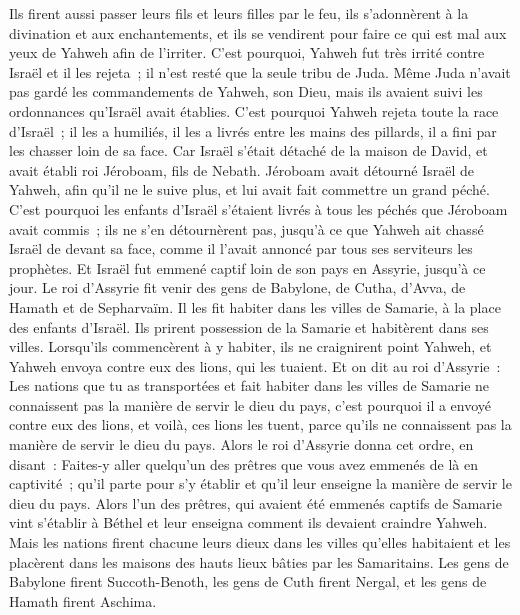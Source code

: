 \begin{multicols}{2}
Ils firent aussi passer leurs fils et leurs filles par le feu, ils s'adonnèrent à la divination et aux enchantements, et ils se vendirent pour faire ce qui est mal aux yeux de Yahweh afin de l'irriter.
C'est pourquoi, Yahweh fut très irrité contre Israël et il les rejeta~; il n'est resté que la seule tribu de Juda.
Même Juda n'avait pas gardé les commandements de Yahweh, son Dieu, mais ils avaient suivi les ordonnances qu'Israël avait établies.
C'est pourquoi Yahweh rejeta toute la race d'Israël~; il les a humiliés, il les a livrés entre les mains des pillards, il a fini par les chasser loin de sa face.
Car Israël s'était détaché de la maison de David, et avait établi roi Jéroboam, fils de Nebath. Jéroboam avait détourné Israël de Yahweh, afin qu'il ne le suive plus, et lui avait fait commettre un grand péché.
C'est pourquoi les enfants d'Israël s'étaient livrés à tous les péchés que Jéroboam avait commis~; ils ne s'en détournèrent pas,
jusqu'à ce que Yahweh ait chassé Israël de devant sa face, comme il l'avait annoncé par tous ses serviteurs les prophètes. Et Israël fut emmené captif loin de son pays en Assyrie, jusqu'à ce jour.
Le roi d'Assyrie fit venir des gens de Babylone, de Cutha, d'Avva, de Hamath et de Sepharvaïm. Il les fit habiter dans les villes de Samarie, à la place des enfants d'Israël. Ils prirent possession de la Samarie et habitèrent dans ses villes.
Lorsqu'ils commencèrent à y habiter, ils ne craignirent point Yahweh, et Yahweh envoya contre eux des lions, qui les tuaient.
Et on dit au roi d'Assyrie~: Les nations que tu as transportées et fait habiter dans les villes de Samarie ne connaissent pas la manière de servir le dieu du pays, c'est pourquoi il a envoyé contre eux des lions, et voilà, ces lions les tuent, parce qu'ils ne connaissent pas la manière de servir le dieu du pays.
Alors le roi d'Assyrie donna cet ordre, en disant~: Faites-y aller quelqu'un des prêtres que vous avez emmenés de là en captivité~; qu'il parte pour s'y établir et qu'il leur enseigne la manière de servir le dieu du pays.
Alors l'un des prêtres, qui avaient été emmenés captifs de Samarie vint s'établir à Béthel et leur enseigna comment ils devaient craindre Yahweh.
Mais les nations firent chacune leurs dieux dans les villes qu'elles habitaient et les placèrent dans les maisons des hauts lieux bâties par les Samaritains.
Les gens de Babylone firent Succoth-Benoth, les gens de Cuth firent Nergal, et les gens de Hamath firent Aschima.

\end{multicols}
